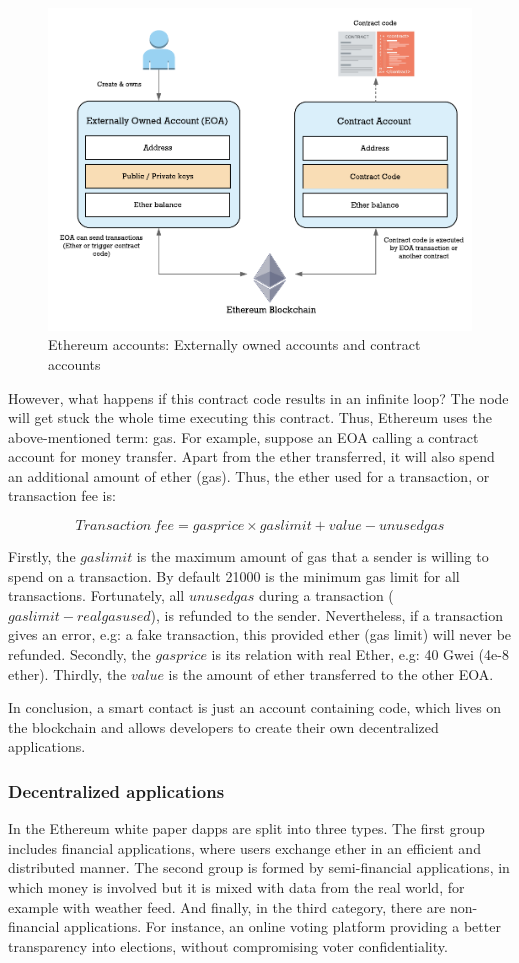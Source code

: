 \begin{figure}[bth]
  \centering
  \includegraphics[width=0.6\linewidth]{gfx/ethereumAccounts}    
  \caption{Ethereum accounts: Externally owned accounts and contract 			accounts}
  \label{fig:EthereumAccounts}
\end{figure}

However, what happens if this contract code results in an infinite loop? The node will get stuck the whole time executing this contract. Thus, Ethereum uses the above-mentioned term: gas. For example, suppose an EOA calling a contract account for money transfer. Apart from the ether transferred, it will also spend an additional amount of ether (gas). Thus, the ether used for a transaction, or transaction fee is:

$$Transaction\ fee = gas price \times gas limit + value - unused gas$$

Firstly, the $gas limit$ is the maximum amount of gas that a sender is willing to spend on a transaction. By default 21000 is the minimum gas limit for all
transactions. Fortunately, all $unused gas$ during a transaction ($gas limit - real gas used$), is refunded to the sender. Nevertheless, if a transaction gives an error, e.g: a fake transaction, this provided ether (gas limit) will never be refunded. Secondly, the $gas price$ is its relation with real Ether, e.g: 40 Gwei (4e-8 ether). Thirdly, the $value$ is the amount of ether transferred to the other EOA.

In conclusion, a smart contact is just an account containing code, which lives on the blockchain and allows developers to create their own decentralized applications. 

\subsubsection{Decentralized applications}

In the Ethereum white paper \cite{buterin2014next} dapps are split into three types. The first group includes financial applications, where users exchange ether in an efficient and distributed manner. The second group is formed by semi-financial applications, in which money is involved but it is mixed with data from the real world, for example with weather feed. And finally, in the third category, there are non-financial applications. For instance, an online voting platform providing a better transparency into elections, without compromising voter confidentiality.

